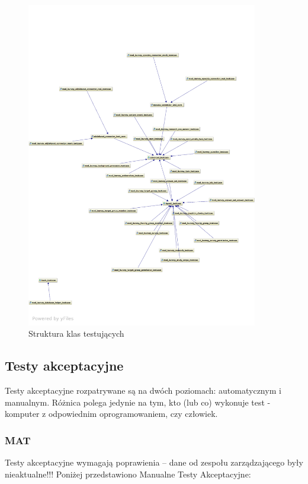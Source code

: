 \begin{figure}[H]
\begin{center}
\includegraphics[width=0.9\textwidth]{figures/lw/tests.pdf} 
\end{center}
\caption{Struktura klas testujących}
\label{fig:tests}
\end{figure}

\subsection{Testy akceptacyjne}
\label{Chapter713}

Testy akceptacyjne rozpatrywane są na dwóch poziomach: automatycznym i manualnym. Różnica polega jedynie na tym, kto (lub co) wykonuje test - komputer z odpowiednim oprogramowaniem, czy człowiek.

\subsubsection{MAT}
\label{Chapter7131}
{\color{red}Testy akceptacyjne wymagają poprawienia -- dane od zespołu zarządzającego były nieaktualne!!!}
Poniżej przedstawiono Manualne Testy Akceptacyjne:

